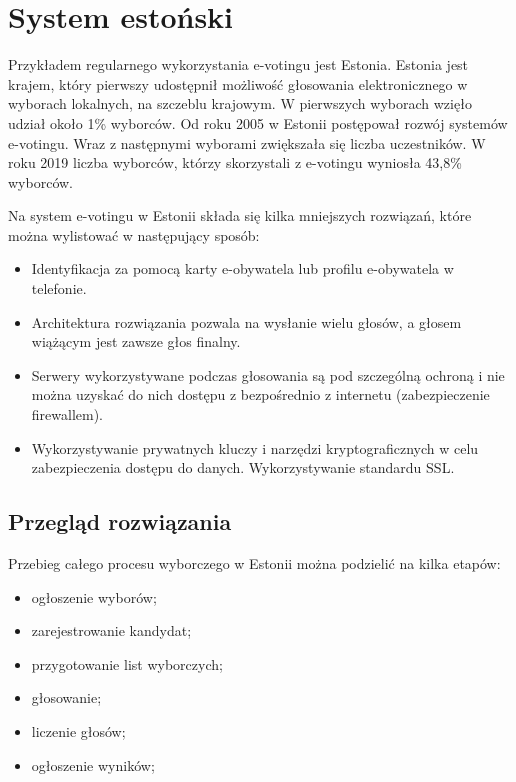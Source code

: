 \documentclass{report}
\begin{document}
\section{System estoński}
Przykładem regularnego wykorzystania e-votingu jest Estonia. Estonia jest krajem, który pierwszy udostępnił możliwość głosowania elektronicznego w wyborach lokalnych, na szczeblu krajowym. W pierwszych wyborach wzięło udział około 1\% wyborców. Od roku 2005 w Estonii postępował rozwój systemów e-votingu. Wraz z następnymi wyborami zwiększała się liczba uczestników. W roku 2019 liczba wyborców, którzy skorzystali z e-votingu wyniosła 43,8\% wyborców.

Na system e-votingu  w Estonii składa się kilka mniejszych rozwiązań, które można wylistować w następujący sposób:
\begin{itemize}

    \item Identyfikacja za pomocą karty e-obywatela lub profilu e-obywatela w telefonie.

    \item Architektura rozwiązania pozwala na wysłanie wielu głosów, a głosem wiążącym jest zawsze głos finalny.

    \item Serwery wykorzystywane podczas głosowania są pod szczególną ochroną i nie można uzyskać do nich dostępu z bezpośrednio z internetu (zabezpieczenie firewallem).

    \item Wykorzystywanie prywatnych kluczy i narzędzi kryptograficznych w celu zabezpieczenia dostępu do danych. Wykorzystywanie standardu SSL.
    
\end{itemize}

\subsection{Przegląd rozwiązania}
Przebieg całego procesu wyborczego w Estonii można podzielić na kilka etapów:
\begin{itemize}
    \item ogłoszenie wyborów;
    \item zarejestrowanie kandydat;
    \item przygotowanie list wyborczych;
    \item głosowanie;
    \item liczenie głosów;
    \item ogłoszenie wyników;
\end{itemize}
\end{document}

